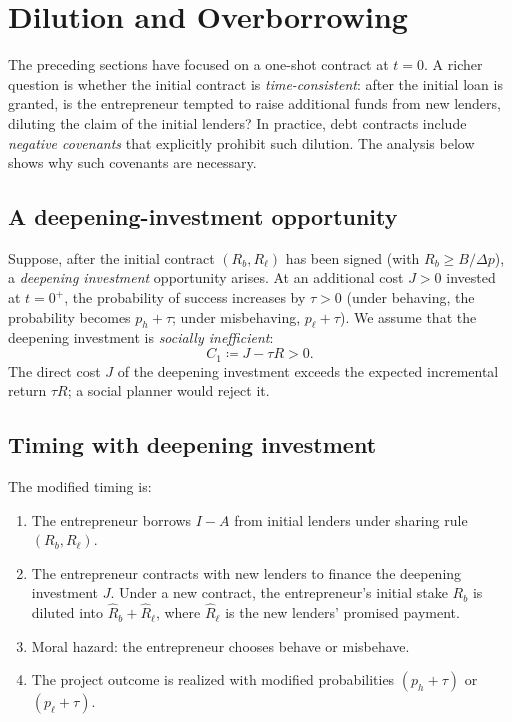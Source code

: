 \documentclass[11pt,a4paper,oneside]{book}
\def\geq{\geqslant}
\theoremstyle{plain}
\theoremstyle{definition}
\theoremstyle{remark}
\numberwithin{equation}{chapter}
\begin{document}
\section{Dilution and Overborrowing}
\label{sec:HT-dilution}

The preceding sections have focused on a one-shot contract at $t=0$.
A richer question is whether the initial contract is \emph{time-consistent}: after the initial loan is granted, is the entrepreneur tempted to raise additional funds from new lenders, diluting the claim of the initial lenders?
In practice, debt contracts include \emph{negative covenants} that explicitly prohibit such dilution.
The analysis below shows why such covenants are necessary.

\subsection{A deepening-investment opportunity}

Suppose, after the initial contract $(R_b, R_\ell)$ has been signed (with $R_b \geq B/\Delta p$), a \emph{deepening investment} opportunity arises.
At an additional cost $J > 0$ invested at $t=0^+$, the probability of success increases by $\tau > 0$ (under behaving, the probability becomes $p_h + \tau$; under misbehaving, $p_\ell + \tau$).
We assume that the deepening investment is \emph{socially inefficient}:
\begin{equation}\label{eq:HT-inefficient}
  C_1 \coloneqq J - \tau R > 0.
\end{equation}
The direct cost $J$ of the deepening investment exceeds the expected incremental return $\tau R$; a social planner would reject it.

\subsection{Timing with deepening investment}

The modified timing is:
\begin{enumerate}
  \item The entrepreneur borrows $I - A$ from initial lenders under sharing rule $(R_b, R_\ell)$.
  \item The entrepreneur contracts with new lenders to finance the deepening investment $J$.
  Under a new contract, the entrepreneur's initial stake $R_b$ is diluted into $\widehat{R}_b + \widehat{R}_\ell$, where $\widehat{R}_\ell$ is the new lenders' promised payment.
  \item Moral hazard: the entrepreneur chooses behave or misbehave.
  \item The project outcome is realized with modified probabilities $(p_h + \tau)$ or $(p_\ell + \tau)$.
\end{enumerate}
\end{document}
